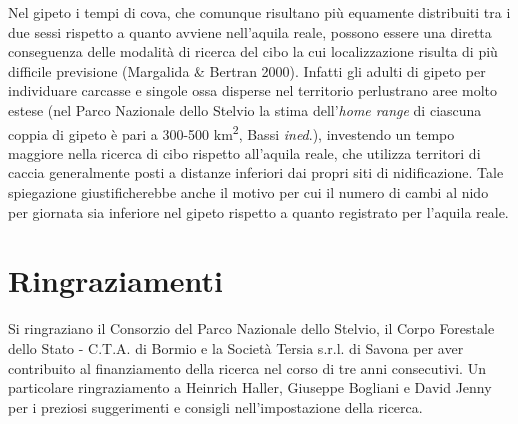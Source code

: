 Nel gipeto i tempi di cova, che comunque risultano pi\`u equamente
distribuiti tra i due sessi rispetto a quanto avviene
nell{\textquoteright}aquila reale, possono essere una diretta
conseguenza delle modalit\`a di ricerca del cibo la cui localizzazione
risulta di pi\`u difficile previsione (Margalida \& Bertran 2000).
Infatti gli adulti di gipeto per individuare carcasse e singole ossa
disperse nel territorio perlustrano aree molto estese (nel Parco
Nazionale dello Stelvio la stima dell{\textquoteright}\textit{home
range} di ciascuna coppia di gipeto \`e pari a 300-500
km\textsuperscript{2}, Bassi \textit{ined}.), investendo un tempo
maggiore nella ricerca di cibo rispetto all{\textquoteright}aquila
reale, che utilizza territori di caccia generalmente posti a distanze
inferiori dai propri siti di nidificazione. Tale spiegazione
giustificherebbe anche il motivo per cui il numero di cambi al nido per
giornata sia inferiore nel gipeto rispetto a quanto registrato per
l{\textquoteright}aquila reale. 

\section*{Ringraziamenti}

Si ringraziano il Consorzio del Parco Nazionale dello Stelvio, il Corpo
Forestale dello Stato - C.T.A. di Bormio e la Societ\`a Tersia s.r.l.
di Savona per aver contribuito al finanziamento della ricerca nel corso
di tre anni consecutivi. Un particolare ringraziamento a Heinrich
Haller, Giuseppe Bogliani e David Jenny per i preziosi suggerimenti e
consigli nell{\textquoteright}impostazione della ricerca.

